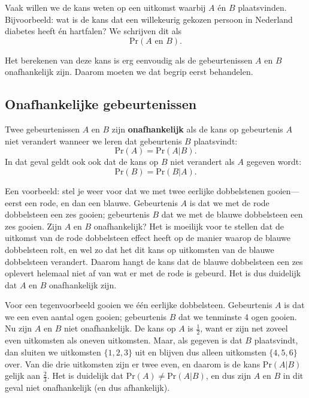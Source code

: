 \documentclass[
  a4paper,
]{scrbook}
\theoremstyle{definition}
\theoremstyle{definition}
\theoremstyle{remark}
\begin{document}
Vaak willen we de kans weten op een uitkomst waarbij \(A\) én \(B\)
plaatsvinden. Bijvoorbeeld: wat is de kans dat een willekeurig gekozen
persoon in Nederland diabetes heeft én hartfalen? We schrijven dit als
\[ \textrm{Pr}\!\left(A \textrm{ en } B\right). \]

Het berekenen van deze kans is erg eenvoudig als de gebeurtenissen \(A\)
en \(B\) onafhankelijk zijn. Daarom moeten we dat begrip eerst
behandelen.

\subsection{Onafhankelijke
gebeurtenissen}\label{onafhankelijke-gebeurtenissen}

Twee gebeurtenissen \(A\) en \(B\) zijn \textbf{onafhankelijk} als de
kans op gebeurtenis \(A\) niet verandert wanneer we leren dat
gebeurtenis \(B\) plaatsvindt:
\[ \textrm{Pr}\!\left(A\right) = \textrm{Pr}\!\left(A | B\right). \] In
dat geval geldt ook ook dat de kans op \(B\) niet verandert als \(A\)
gegeven wordt:
\[ \textrm{Pr}\!\left(B\right) = \textrm{Pr}\!\left(B | A\right). \]

Een voorbeeld: stel je weer voor dat we met twee eerlijke dobbelstenen
gooien--- eerst een rode, en dan een blauwe. Gebeurtenis \(A\) is dat we
met de rode dobbelsteen een zes gooien; gebeurtenis \(B\) dat we met de
blauwe dobbelsteen een zes gooien. Zijn \(A\) en \(B\) onafhankelijk?
Het is moeilijk voor te stellen dat de uitkomst van de rode dobbelsteen
effect heeft op de manier waarop de blauwe dobbelsteen rolt, en wel zo
dat het dit kans op uitkomsten van de blauwe dobbelsteen verandert.
Daarom hangt de kans dat de blauwe dobbelsteen een zes oplevert helemaal
niet af van wat er met de rode is gebeurd. Het is dus duidelijk dat
\(A\) en \(B\) onafhankelijk zijn.

Voor een tegenvoorbeeld gooien we één eerlijke dobbelsteen. Gebeurtenis
\(A\) is dat we een even aantal ogen gooien; gebeurtenis \(B\) dat we
tenminste 4 ogen gooien. Nu zijn \(A\) en \(B\) niet onafhankelijk. De
kans op \(A\) is \(\frac{1}{2}\), want er zijn net zoveel even
uitkomsten als oneven uitkomsten. Maar, als gegeven is dat \(B\)
plaatsvindt, dan sluiten we uitkomsten \(\{1, 2, 3\}\) uit en blijven
dus alleen uitkomsten \(\{4, 5, 6\}\) over. Van die drie uitkomsten zijn
er twee even, en daarom is de kans \(\textrm{Pr}\!\left(A | B\right)\)
gelijk aan \(\frac{2}{3}\). Het is duidelijk dat
\(\textrm{Pr}\!\left(A\right) \neq \textrm{Pr}\!\left(A | B\right)\), en
dus zijn \(A\) en \(B\) in dit geval niet onafhankelijk (en dus
afhankelijk).
\end{document}
